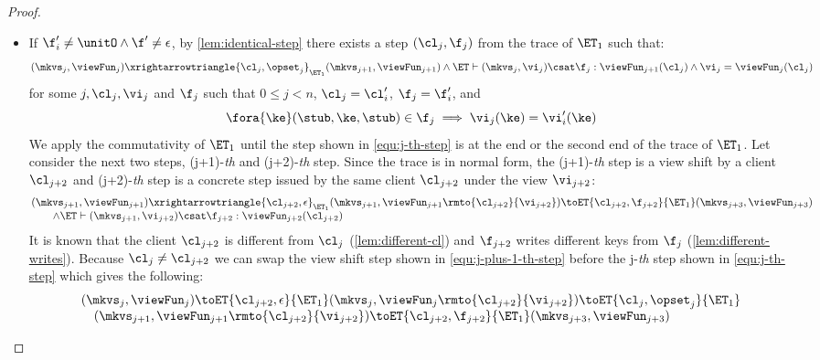 \begin{proof}
\begin{itemize}
\begin{itemize}
    \item If \( \f'_i \neq \unitO  \land \f' \neq \epsilon \), by \cref{lem:identical-step} there exists a step \( (\cl_j, \f_j) \) from the trace of \( \ET_1 \) such that:
\begin{equation}
    \label{equ:j-th-step}
    (\mkvs_{j}, \viewFun_{j}) \xrightarrowtriangle{\cl_{j}, \opset_{j}}_{\ET_1} (\mkvs_{j + 1}, \viewFun_{j + 1}) \land \ET \vdash (\mkvs_{j}, \vi_j) \csat \f_j : \viewFun_{j + 1}(\cl_{j}) \land \vi_j = \viewFun_{j}(\cl_j)
\end{equation}
for some \( j, \cl_j, \vi_j\) and \( \f_j \) such that \( 0 \leq  j < n \), \( \cl_j = \cl'_{i}\), \( \f_j = \f'_{i}\), and
\[ 
    \fora{\ke} (\stub, \ke, \stub ) \in \f_j \implies \vi_j(\ke) = \vi'_{i}(\ke)
\]
We apply the commutativity of \( \ET_1 \) until the step shown in \cref{equ:j-th-step} is at the end or the second end of the trace of \( \ET_1 \).
Let consider the next two steps, (j+1)-\emph{th} and (j+2)-\emph{th} step.
Since the trace is in normal form, the (j+1)-\emph{th} step is a view shift by a client \( \cl_{j+2} \) and (j+2)-\emph{th} step is a concrete step issued by the same client \( \cl_{j+2} \) under the view \( \vi_{j+2} \):
\begin{equation}
    \label{equ:j-plus-1-th-step}
    \begin{array}{@{}l@{}}
        (\mkvs_{j+1}, \viewFun_{j+1}) \xrightarrowtriangle{\cl_{j+2}, \epsilon}_{\ET_1} (\mkvs_{j+1}, \viewFun_{j+1}\rmto{\cl_{j+2}}{\vi_{j+2}}) \toET{\cl_{j+2}, \f_{j+2}}{\ET_1} (\mkvs_{j+3}, \viewFun_{j+3}) \\
        \qquad \land \ET \vdash (\mkvs_{j+1},\vi_{j+2}) \csat \f_{j+2} : \viewFun_{j+2}(\cl_{j+2}) 
    \end{array}
\end{equation}
It is known that the client  \( \cl_{j+2} \) is different from \( \cl_j \) (\cref{lem:different-cl}) and \( \f_{j+2} \) writes different keys from \( \f_j\) (\cref{lem:different-writes}). 
Because \( \cl_j \neq \cl_{j+2} \) we can swap the view shift step shown in \cref{equ:j-plus-1-th-step} before the j-\emph{th} step shown in \cref{equ:j-th-step} which gives the following:
\begin{equation}
    \label{equ:swap-the-view-shift-et1}
    \begin{array}{@{}l@{}}
    (\mkvs_{j}, \viewFun_{j}) \toET{\cl_{j+2}, \epsilon}{\ET_1} (\mkvs_{j}, \viewFun_{j}\rmto{\cl_{j+2}}{\vi_{j+2}}) \toET{\cl_{j}, \opset_{j}}{\ET_1} \\
    \quad (\mkvs_{j + 1}, \viewFun_{j + 1}\rmto{\cl_{j+2}}{\vi_{j+2}}) \toET{\cl_{j+2}, \f_{j+2}}{\ET_1} (\mkvs_{j+3}, \viewFun_{j+3})

\end{array}
\end{equation}
\end{itemize}
\end{itemize}
\end{proof}

